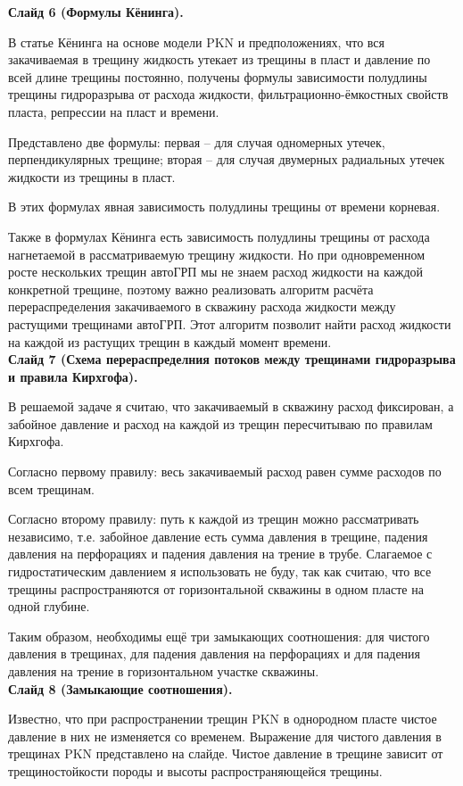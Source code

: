 \documentclass[a4paper, 12pt]{article}
\begin{document}
\textbf{Слайд 6 (Формулы Кёнинга).}

В статье Кёнинга на основе модели PKN и предположениях, что вся закачиваемая в трещину жидкость утекает из трещины в пласт и давление по всей длине трещины постоянно, получены формулы зависимости полудлины трещины гидроразрыва от расхода жидкости, фильтрационно-ёмкостных свойств пласта, репрессии на пласт и времени.

Представлено две формулы: первая -- для случая одномерных утечек, перпендикулярных трещине; вторая -- для случая двумерных радиальных утечек жидкости из трещины в пласт.

В этих формулах явная зависимость полудлины трещины от времени корневая.

Также в формулах Кёнинга есть зависимость полудлины трещины от расхода нагнетаемой в рассматриваемую трещину жидкости.
Но при одновременном росте нескольких трещин автоГРП мы не знаем расход жидкости на каждой конкретной трещине, поэтому важно реализовать алгоритм расчёта перераспределения закачиваемого в скважину расхода жидкости между растущими трещинами автоГРП. Этот алгоритм позволит найти расход жидкости на каждой из растущих трещин в каждый момент времени.
\\

\textbf{Слайд 7 (Схема перераспределния потоков между трещинами гидроразрыва и правила Кирхгофа).}

В решаемой задаче я считаю, что закачиваемый в скважину расход фиксирован, а забойное давление и расход на каждой из трещин пересчитываю по правилам Кирхгофа.

Согласно первому правилу: весь закачиваемый расход равен сумме расходов по всем трещинам.

Согласно второму правилу: путь к каждой из трещин можно рассматривать независимо, т.е. забойное давление есть сумма давления в трещине, падения давления на перфорациях и падения давления на трение в трубе.
Слагаемое с гидростатическим давлением я использовать не буду, так как считаю, что все трещины распространяются от горизонтальной скважины в одном пласте на одной глубине.

Таким образом, необходимы ещё три замыкающих соотношения: для чистого давления в трещинах, для падения давления на перфорациях и для падения давления на трение в горизонтальном участке скважины.
\\


\textbf{Слайд 8 (Замыкающие соотношения).}

Известно, что при распространении трещин PKN в однородном пласте чистое давление в них не изменяется со временем.
Выражение для чистого давления в трещинах PKN представлено на слайде. Чистое давление в трещине зависит от трещиностойкости породы и высоты распространяющейся трещины.
\end{document}
